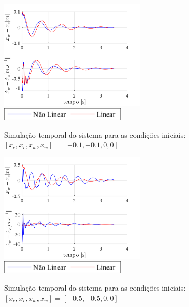 \documentclass[a4paper]{ifacconf}
\begin{document}
    \FloatBarrier
    \begin{figure}[htbp]
        \begin{centering}
            \includegraphics[width=7cm]{img/sim_temp_xc_n01_dxc_n01.png}
            \includegraphics[width=6cm]{img/sim_temp_Leg.png}
            \caption{Simulação temporal do sistema para as condições iniciais:  $[x_c, \dot{x}_c, x_w, \dot{x}_w]=[-0.1,-0.1,0,0]$}
            \label{fig:sim_temp_xc_n01_dxc_n01}
        \end{centering}
    \end{figure}
    \FloatBarrier
    
    \FloatBarrier
    \begin{figure}[htbp]
        \begin{centering}
            \includegraphics[width=7cm]{img/sim_temp_xc_n05_dxc_n05.png}
            \includegraphics[width=6cm]{img/sim_temp_Leg.png}
            \caption{Simulação temporal do sistema para as condições iniciais:  $[x_c, \dot{x}_c, x_w, \dot{x}_w]=[-0.5,-0.5,0,0]$}
            \label{fig:sim_temp_xc_n05_dxc_n05}
        \end{centering}
    \end{figure}
    \FloatBarrier
    
\end{document}
